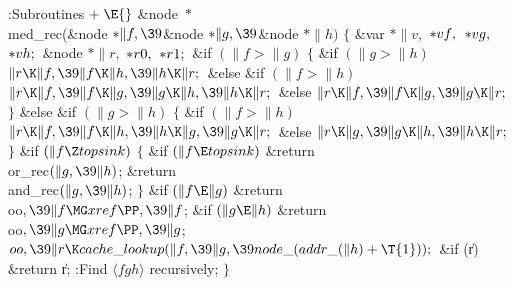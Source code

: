 \Y\B\4:Subroutines\X${}\mathrel+\E{}$\6
\&{node} ${}{*}{}$\\{med\_rec}(\&{node} ${}{*}\|f,\39{}$\&{node} ${}{*}\|g,%
\39{}$\&{node} ${}{*}\|h){}$\1\1\2\2\6
${}\{{}$\1\6
\&{var} ${}{*}\|v,{}$ ${}{*}\\{vf},{}$ ${}{*}\\{vg},{}$ ${}{*}\\{vh};{}$\6
\&{node} ${}{*}\|r,{}$ ${}{*}\\{r0},{}$ ${}{*}\\{r1};{}$\7
\&{if} ${}(\|f>\|g){}$\5
${}\{{}$\1\6
\&{if} ${}(\|g>\|h){}$\1\5
${}\|r\K\|f,\39\|f\K\|h,\39\|h\K\|r;{}$\2\6
\&{else} \&{if} ${}(\|f>\|h){}$\1\5
${}\|r\K\|f,\39\|f\K\|g,\39\|g\K\|h,\39\|h\K\|r;{}$\2\6
\&{else}\1\5
${}\|r\K\|f,\39\|f\K\|g,\39\|g\K\|r;{}$\2\6
\4${}\}{}$\5
\2\&{else} \&{if} ${}(\|g>\|h){}$\5
${}\{{}$\1\6
\&{if} ${}(\|f>\|h){}$\1\5
${}\|r\K\|f,\39\|f\K\|h,\39\|h\K\|g,\39\|g\K\|r;{}$\2\6
\&{else}\1\5
${}\|r\K\|g,\39\|g\K\|h,\39\|h\K\|r;{}$\2\6
\4${}\}{}$\2\6
\&{if} ${}(\|f\Z\\{topsink}){}$\5
${}\{{}$\1\6
\&{if} ${}(\|f\E\\{topsink}){}$\1\5
\&{return} \\{or\_rec}${}(\|g,\39\|h){}$;\2\6
\&{return} \\{and\_rec}${}(\|g,\39\|h){}$;\6
\4${}\}{}$\2\6
\&{if} ${}(\|f\E\|g){}$\1\5
\&{return} \\{oo}${},\39\|f\MG\\{xref}\PP,\39\|f{}$;\2\6
\&{if} ${}(\|g\E\|h){}$\1\5
\&{return} \\{oo}${},\39\|g\MG\\{xref}\PP,\39\|g{}$;\2\6
${}\\{oo},\39\|r\K\\{cache\_lookup}(\|f,\39\|g,\39\\{node\_}(\\{addr\_}(\|h)+%
\T{1}));{}$\6
\&{if} (\|r)\1\5
\&{return} \|r;\2\6
:Find $\langle fgh\rangle$ recursively\X;\6
\4${}\}{}$\2\par
\fi

